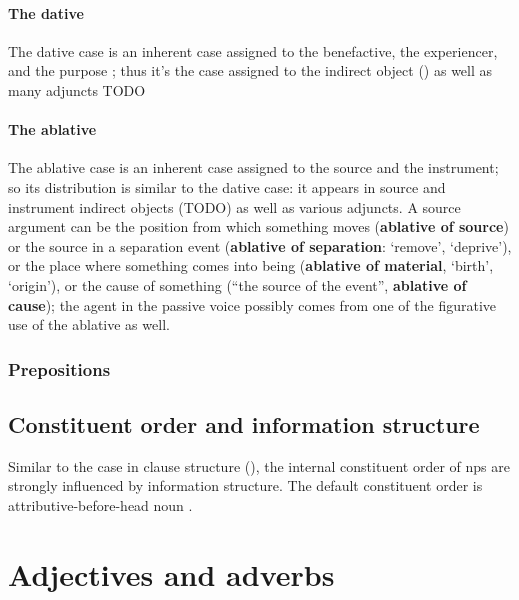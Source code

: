 \documentclass[a4paper, oneside, 12pt]{report}
\newcommand*{\citepage}[1]{p.~{#1}}
\newcommand*{\concept}[1]{\textbf{#1}}
\newcommand{\translate}[1]{`#1'}
\begin{document}
\subsubsection{The dative}\label{sec:dative-distribution}

The dative case is an inherent case assigned to the benefactive, the experiencer, and the purpose
\citep[\citepage{251}]{oniga2014latin};
thus it's the case assigned to the indirect object ()
as well as many adjuncts TODO

\subsubsection{The ablative}

The ablative case is an inherent case assigned to 
the source and the instrument;
so its distribution is similar to the dative case: 
it appears in source and instrument indirect objects (TODO) 
as well as various adjuncts.
A source argument
can be the position from which something moves 
(\concept{ablative of source})
or the source in a separation event 
(\concept{ablative of separation}: \translate{remove}, \translate{deprive}),
or the place where something comes into being 
(\concept{ablative of material}, \translate{birth}, \translate{origin}), 
or the cause of something (``the source of the event'', \concept{ablative of cause});
the agent in the passive voice possibly 
comes from one of the figurative use of the ablative as well.

\subsection{Prepositions}

\section{Constituent order and information structure}

Similar to the case in clause structure (),
the internal constituent order of \acs{np}s are strongly influenced by 
information structure.
The default constituent order is attributive-before-head noun
\citep[\citepage{396}]{allen1903allen}.

\chapter{Adjectives and adverbs}
\end{document}
